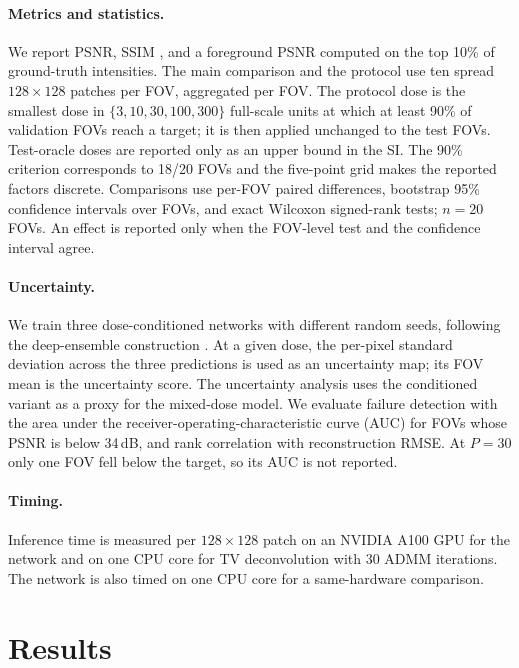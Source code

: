 \documentclass[10pt]{article}
\begin{document}
\paragraph{Metrics and statistics.}
We report PSNR, SSIM \cite{wang2004ssim}, and a foreground PSNR computed on the
top 10\% of ground-truth intensities. The main comparison and the protocol use ten spread
$128\times128$ patches per FOV, aggregated per FOV. The protocol dose is the
smallest dose in $\{3,10,30,100,300\}$ full-scale units at which at least 90\%
of validation FOVs reach a target; it is then applied unchanged to the test
FOVs. Test-oracle doses are reported only as an upper bound in the SI. The
90\% criterion corresponds to 18/20 FOVs and the five-point grid makes the
reported factors discrete. Comparisons use per-FOV paired differences,
bootstrap 95\% confidence intervals over FOVs, and exact Wilcoxon signed-rank
tests; $n=20$ FOVs. An effect is reported only when the FOV-level test and the
confidence interval agree. 

\paragraph{Uncertainty.}
We train three dose-conditioned networks with different random seeds, following
the deep-ensemble construction \cite{lakshminarayanan2017ensembles}. At a given
dose, the per-pixel standard deviation across the three predictions is used as
an uncertainty map; its FOV mean is the uncertainty score. The uncertainty
analysis uses the conditioned variant as a proxy for the mixed-dose model. We evaluate failure detection with the
area under the receiver-operating-characteristic curve (AUC) for FOVs whose
PSNR is below 34\,dB, and rank correlation with reconstruction RMSE. At $P=30$
only one FOV fell below the target, so its AUC is not reported.

\paragraph{Timing.}
Inference time is measured per $128\times128$ patch on an NVIDIA A100 GPU for
the network and on one CPU core for TV deconvolution with 30 ADMM iterations.
The network is also timed on one CPU core for a same-hardware comparison.

\section{Results}
\end{document}
